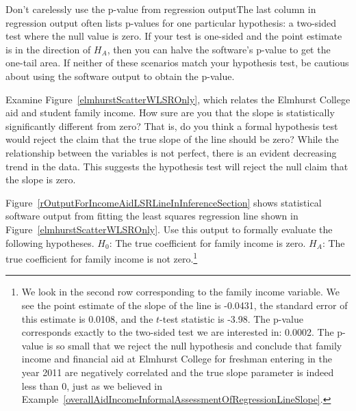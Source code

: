 \begin{caution}{Don't carelessly use the p-value from regression output}{The last column in regression output often lists p-values for one particular hypothesis: a two-sided test where the null value is zero. If your test is one-sided and the point estimate is in the direction of $H_A$, then you can halve the software's p-value to get the one-tail area. If neither of these scenarios match your hypothesis test, be cautious about using the software output to obtain the p-value.}
\end{caution}

\begin{example}{Examine Figure~\vref{elmhurstScatterWLSROnly}, which relates the Elmhurst College aid and student family income. How sure are you that the slope is statistically significantly different from zero? That is, do you think a formal hypothesis test would reject the claim that the true slope of the line should be zero?} \label{overallAidIncomeInformalAssessmentOfRegressionLineSlope}
While the relationship between the variables is not perfect, there is an evident decreasing trend in the data. This suggests the hypothesis test will reject the null claim that the slope is zero.
\end{example}

\begin{exercise}
Figure~\ref{rOutputForIncomeAidLSRLineInInferenceSection} shows statistical software output from fitting the least squares regression line shown in Figure~\ref{elmhurstScatterWLSROnly}. Use this output to formally evaluate the following hypotheses. $H_0$: The true coefficient for family income is zero. $H_A$: The true coefficient for family income is not zero.\footnote{We look in the second row corresponding to the family income variable. We see the point estimate of the slope of the line is -0.0431, the standard error of this estimate is 0.0108, and the $t$-test statistic is -3.98. The p-value corresponds exactly to the two-sided test we are interested in: 0.0002. The p-value is so small that we reject the null hypothesis and conclude that family income and financial aid at Elmhurst College for freshman entering in the year 2011 are negatively correlated and the true slope parameter is indeed less than 0, just as we believed in Example~\ref{overallAidIncomeInformalAssessmentOfRegressionLineSlope}.}
\end{exercise}

